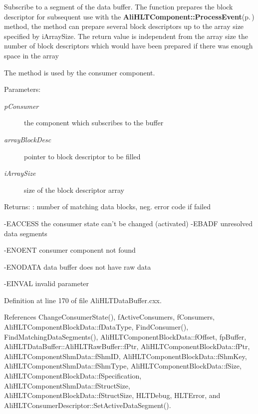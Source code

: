 Subscribe to a segment of the data buffer. The function prepares the block descriptor for subsequent use with the {\bf Ali\-HLTComponent::Process\-Event}{\rm (p.\,\pageref{classAliHLTComponent_a6})} method, the method can prepare several block descriptors up to the array size specified by i\-Array\-Size. The return value is independent from the array size the number of block descriptors which would have been prepared if there was enough space in the array\par
 The method is used by the consumer component. \begin{Desc}
\item[Parameters:]
\begin{description}
\item[{\em p\-Consumer}]the component which subscribes to the buffer \item[{\em array\-Block\-Desc}]pointer to block descriptor to be filled \item[{\em i\-Array\-Size}]size of the block descriptor array \end{description}
\end{Desc}
\begin{Desc}
\item[Returns:]: number of matching data blocks, neg. error code if failed\par
 -EACCESS the consumer state can't be changed (activated) -EBADF unresolved data segments \par
 -ENOENT consumer component not found \par
 -ENODATA data buffer does not have raw data \par
 -EINVAL invalid parameter \par
 \end{Desc}


Definition at line 170 of file Ali\-HLTData\-Buffer.cxx.

References Change\-Consumer\-State(), f\-Active\-Consumers, f\-Consumers, Ali\-HLTComponent\-Block\-Data::f\-Data\-Type, Find\-Consumer(), Find\-Matching\-Data\-Segments(), Ali\-HLTComponent\-Block\-Data::f\-Offset, fp\-Buffer, Ali\-HLTData\-Buffer::Ali\-HLTRaw\-Buffer::f\-Ptr, Ali\-HLTComponent\-Block\-Data::f\-Ptr, Ali\-HLTComponent\-Shm\-Data::f\-Shm\-ID, Ali\-HLTComponent\-Block\-Data::f\-Shm\-Key, Ali\-HLTComponent\-Shm\-Data::f\-Shm\-Type, Ali\-HLTComponent\-Block\-Data::f\-Size, Ali\-HLTComponent\-Block\-Data::f\-Specification, Ali\-HLTComponent\-Shm\-Data::f\-Struct\-Size, Ali\-HLTComponent\-Block\-Data::f\-Struct\-Size, HLTDebug, HLTError, and Ali\-HLTConsumer\-Descriptor::Set\-Active\-Data\-Segment().

